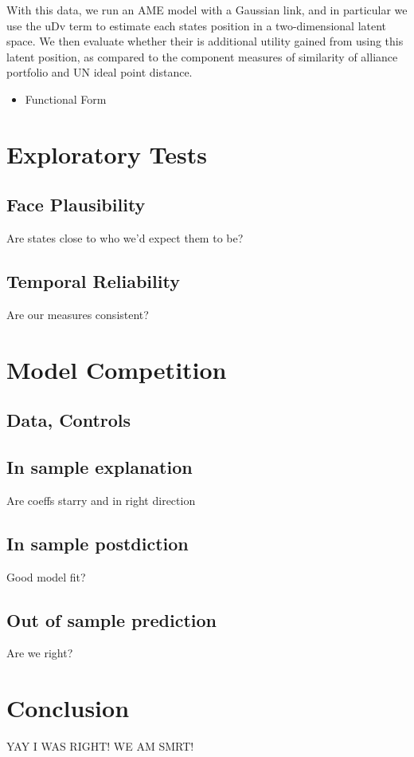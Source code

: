 \documentclass[fignum,letterpaper,12pt]{amsart}
\begin{document}
With this data, we run an AME model with a Gaussian link, and in particular we use the uDv term to estimate each states position in a two-dimensional latent space. We then evaluate whether their is additional utility gained from using this latent position, as compared to the component measures of similarity of alliance portfolio and UN ideal point distance.
\begin{itemize}
\item Functional Form
\end{itemize}
\section{Exploratory Tests}
\subsection{Face Plausibility}
Are states close to who we'd expect them to be?
\subsection{Temporal Reliability}
Are our measures consistent?
\section{Model Competition}
\subsection{Data, Controls}
\subsection{In sample explanation}
Are coeffs starry and in right direction
\subsection{In sample postdiction}
Good model fit?
\subsection{Out of sample prediction}
Are we right?
\section{Conclusion}
YAY I WAS RIGHT! WE AM SMRT!

 
\end{document}
